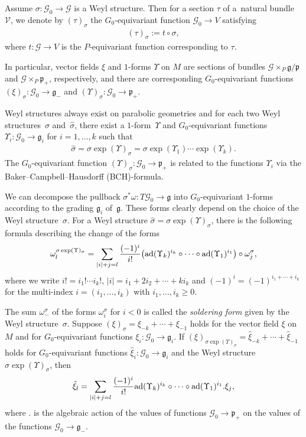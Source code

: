 \documentclass[pdftex]{sigma}
\newcommand{\om}{\omega}
\newcommand{\si}{\sigma}
\newcommand{\ba}{\mathcal{G}}
\newcommand{\fg}{\mathfrak g}
\newcommand{\fp}{\mathfrak p}
\newcommand{\U}{\Upsilon}
\newcommand{\ad}{{\rm ad}}
\numberwithin{equation}{section}
\begin{document}
\begin{Definition}
Assume $\si\colon \ba_0\to \ba$ is a Weyl structure. Then for a section $\tau$ of a~natural bundle $\mathcal{V}$, we denote by $(\tau)_\si$ the $G_0$-equivariant function $\ba_0 \to V$ satisfying \begin{gather*}(\tau)_\si:=t\circ\si,\end{gather*} where $t\colon \ba \to V$ is the $P$-equivariant function corresponding to $\tau$.
\end{Definition}

In particular, vector f\/ields $\xi$ and $1$-forms $\U$ on $M$ are sections of bundles $\ba\times_P \fg/\fp$ and $\ba\times_P \fp_+$, respectively, and there are corresponding $G_0$-equivariant functions $(\xi)_\si\colon \ba_0\to \fg_-$ and $(\U)_\si\colon \ba_0\to \fp_+$.

Weyl structures always exist on parabolic geometries and for each two Weyl structures~$\si$ and~$\hat \si$, there exist a $1$-form~$\U$ and $G_0$-equivariant functions $\U_i\colon \ba_0 \to \fg_i$ for $i=1,\dots, k$ such that
\begin{gather*}
\hat \si=\si\exp(\U)_\si=\si\exp(\U_1) \cdots \exp(\U_k).
\end{gather*}
The $G_0$-equivariant function $(\U)_\si\colon \ba_0 \to \fp_+$ is related to the functions $\U_i$ via the Baker--Campbell--Hausdorf\/f (BCH)-formula.

We can decompose the pullback $\si^*\om\colon T\ba_0\to \fg$ into $G_0$-equivariant $1$-forms \smash{$\om_{i}^\si\colon T\ba_0\to \fg_i$} according to the grading $\fg_i$ of~$\fg$. These forms clearly depend on the choice of the Weyl struc\-tu\-re~$\si$. For a Weyl structure $\hat \si=\si \exp (\U)_\si$, there is the following formula describing the change of the forms
\begin{gather} \label{change-form}
\om_{l}^{\si\exp(\U)_\si}=\sum_{|i|+j=l} \frac{(-1)^{i}}{i!} \big( \ad(\U_k)^{i_k} \circ \cdots \circ \ad(\U_1)^{i_1}\big)\circ \om_{j}^\si,
\end{gather}
where we write $i!=i_1!\cdots i_k!$, $|i|=i_1+2i_2+ \cdots +ki_k$ and $(-1)^i=(-1)^{i_1+\cdots+i_k}$ for the multi-index $i=(i_1, \dots, i_k)$ with $i_1, \dots, i_k \geq 0$.

The sum $\om_-^\si$ of the forms $\om_{i}^\si$ for $i<0$ is called the \emph{soldering form} given by the Weyl structu\-re~$\si$. Suppose $(\xi)_{\si}=\xi_{-k}+ \cdots+ \xi_{-1}$ holds for the vector f\/ield $\xi$ on $M$ and for $G_0$-equivariant functions $\xi_i\colon \ba_0\to \fg_i$. If $(\xi)_{\si \exp (\U)_\si}=\hat \xi_{-k}+\cdots+\hat \xi_{-1}$ holds for $G_0$-equivariant functions $\hat \xi_i: \ba_0\to \fg_i$ and the Weyl structure $\si\exp (\U)_\si$, then
\begin{gather*}
\hat \xi_l=\sum_{|i|+j=l} \frac{(-1)^i}{i!} \ad(\U_k)^{i_k} \circ \cdots \circ \ad(\U_1)^{i_1}.\xi_{j},
\end{gather*}
where $.$ is the algebraic action of the values of functions $\ba_0\to \fp_+$ on the values of the functions $\ba_0\to \fg_-$.
\end{document}

